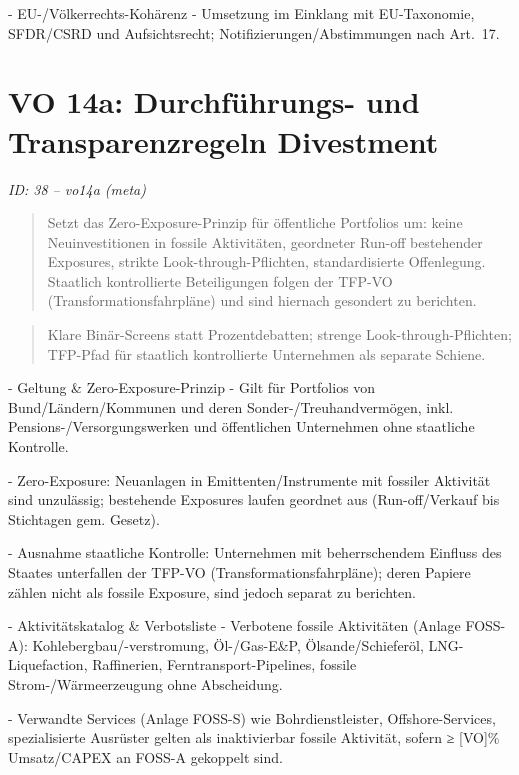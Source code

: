 \documentclass[12pt,a4paper]{scrartcl}
\begin{document}
- EU-/Völkerrechts-Kohärenz
- Umsetzung im Einklang mit EU-Taxonomie, SFDR/CSRD und Aufsichtsrecht; Notifizierungen/Abstimmungen nach Art. 17.


\section[VO 14a: Durchführungs- und Transparenzregeln Divestment]{VO 14a: Durchführungs- und Transparenzregeln Divestment}
\noindent\textit{ID: 38 -- vo14a (meta)}

\begin{quote}
Setzt das Zero-Exposure-Prinzip für öffentliche Portfolios um: keine Neuinvestitionen in fossile Aktivitäten, geordneter Run-off bestehender Exposures, strikte Look-through-Pflichten, standardisierte Offenlegung. Staatlich kontrollierte Beteiligungen folgen der TFP-VO (Transformationsfahrpläne) und sind hiernach gesondert zu berichten.
\end{quote}

{\footnotesize\begin{quote}
Klare Binär-Screens statt Prozentdebatten; strenge Look-through-Pflichten; TFP-Pfad für staatlich kontrollierte Unternehmen als separate Schiene.
\end{quote}}


- Geltung \& Zero-Exposure-Prinzip
- Gilt für Portfolios von Bund/Ländern/Kommunen und deren Sonder-/Treuhandvermögen, inkl. Pensions-/Versorgungswerken und öffentlichen Unternehmen ohne staatliche Kontrolle.

- Zero-Exposure: Neuanlagen in Emittenten/Instrumente mit fossiler Aktivität sind unzulässig; bestehende Exposures laufen geordnet aus (Run-off/Verkauf bis Stichtagen gem. Gesetz).

- Ausnahme staatliche Kontrolle: Unternehmen mit beherrschendem Einfluss des Staates unterfallen der TFP-VO (Transformationsfahrpläne); deren Papiere zählen nicht als fossile Exposure, sind jedoch separat zu berichten.

- Aktivitätskatalog \& Verbotsliste
- Verbotene fossile Aktivitäten (Anlage FOSS-A): Kohlebergbau/-verstromung, Öl-/Gas-E\&P, Ölsande/Schieferöl, LNG-Liquefaction, Raffinerien, Ferntransport-Pipelines, fossile Strom-/Wärmeerzeugung ohne Abscheidung.

- Verwandte Services (Anlage FOSS-S) wie Bohrdienstleister, Offshore-Services, spezialisierte Ausrüster gelten als inaktivierbar fossile Aktivität, sofern ≥ [VO]\% Umsatz/CAPEX an FOSS-A gekoppelt sind.
\end{document}
